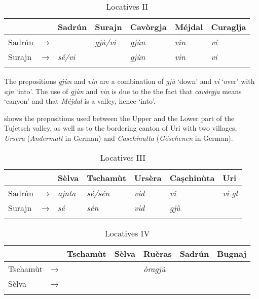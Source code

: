 \begin{table}
	\caption{Locatives II}
	\label{loc2}
	\begin{tabular}{lllllll}
		\lsptoprule
		& & Sadrún & Surajn & Cavòrgja & Méjdal & Curaglja\\ 
		\midrule
		Sadrún  &    →& & \textit{gjù/vi}  & \textit{gjùn}    & \textit{vin} & \textit{vi}\\
		Surajn  &   → &  \textit{sé/vi} & & \textit{gjùn}    & \textit{vin} & \textit{vi}   \\
		\lspbottomrule
	\end{tabular}
\end{table}

The prepositions \textit{gjùn} and \textit{vin} are a combination of \textit{gjù} `down' and \textit{vi} `over' with \textit{ajn} `into'. The use of \textit{gjùn} and \textit{vin} is due to the the fact that \textit{cavòrgja} means `canyon' and that \textit{Méjdal} is a valley, hence `into'.

 shows the prepositions used between the Upper and the Lower part of the Tujetsch valley, as well as to the bordering canton of Uri with two villages, \textit{Ursera} (\textit{Andermatt} in German) and \textit{Caschinutta} (\textit{Göschenen} in German).

\begin{table}
	\caption{Locatives III}
	\label{loc3}
	\begin{tabular}{lllllll}
		\lsptoprule
		& & Sèlva & Tschamùt & Ursèra & Caṣchinùta & Uri\\ 
		\midrule
		Sadrún  & → & \textit{ajnta} & \textit{sé/sén} & \textit{vid} & \textit{vi} & \textit{vi gl}\\
		Surajn  & → & \textit{sé} & \textit{sén}  & \textit{vid} & \textit{gjù} \\
		\lspbottomrule
	\end{tabular}
\end{table}

\begin{table}
	\caption{Locatives IV}
	\label{loc4}
	\begin{tabular}{lllllll}
		\lsptoprule
		& & Tschamùt & Sèlva & Ruèras & Sadrún & Bugnaj\\
		\midrule
		Tschamùt  & →   & \textit{}    & \textit{}     & \textit{òragjù}  & \textit{} & \textit{}\\
		Sèlva  & → & \textit{} &  \textit{}  & \textit{}   & \textit{} \\
		\lspbottomrule
	\end{tabular}
\end{table}

